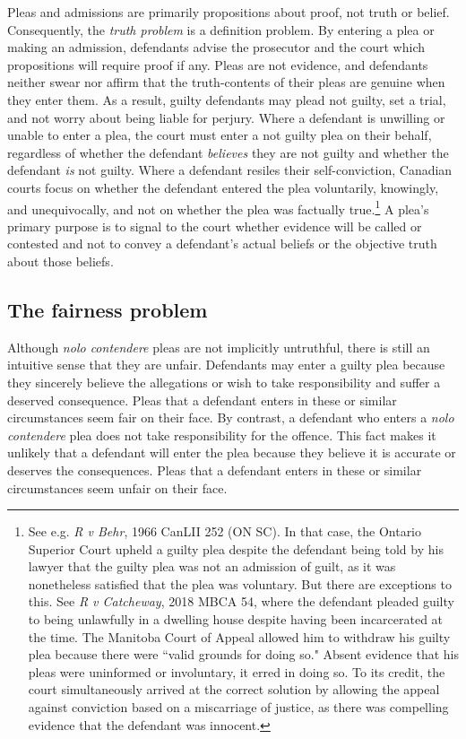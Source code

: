 Pleas and admissions are primarily propositions about proof, not truth or belief. Consequently, the \textit{truth problem} is a definition problem. By entering a plea or making an admission, defendants advise the prosecutor and the court which propositions will require proof if any. Pleas are not evidence, and defendants neither swear nor affirm that the truth-contents of their pleas are genuine when they enter them. As a result, guilty defendants may plead not guilty, set a trial, and not worry about being liable for perjury. Where a defendant is unwilling or unable to enter a plea, the court must enter a not guilty plea on their behalf, regardless of whether the defendant \textit{believes} they are not guilty and whether the defendant \textit{is} not guilty. Where a defendant resiles their self-conviction, Canadian courts focus on whether the defendant entered the plea voluntarily, knowingly, and unequivocally, and not on whether the plea was factually true.\footnote{See e.g. \textit{R v Behr}, 1966 CanLII 252 (ON SC). In that case, the Ontario Superior Court upheld a guilty plea despite the defendant being told by his lawyer that the guilty plea was not an admission of guilt, as it was nonetheless satisfied that the plea was voluntary. But there are exceptions to this. See \textit{R v Catcheway}, 2018 MBCA 54, where the defendant pleaded guilty to being unlawfully in a dwelling house despite having been incarcerated at the time. The Manitoba Court of Appeal allowed him to withdraw his guilty plea because there were ``valid grounds for doing so." Absent evidence that his pleas were uninformed or involuntary, it erred in doing so. To its credit, the court simultaneously arrived at the correct solution by allowing the appeal against conviction based on a miscarriage of justice, as there was compelling evidence that the defendant was innocent.} A plea's primary purpose is to signal to the court whether evidence will be called or contested and not to convey a defendant's actual beliefs or the objective truth about those beliefs.

\subsection{The fairness problem}

Although \textit{nolo contendere} pleas are not implicitly untruthful, there is still an intuitive sense that they are unfair. Defendants may enter a guilty plea because they sincerely believe the allegations or wish to take responsibility and suffer a deserved consequence. Pleas that a defendant enters in these or similar circumstances seem fair on their face. By contrast, a defendant who enters a \textit{nolo contendere} plea does not take responsibility for the offence. This fact makes it unlikely that a defendant will enter the plea because they believe it is accurate or deserves the consequences. Pleas that a defendant enters in these or similar circumstances seem unfair on their face.

